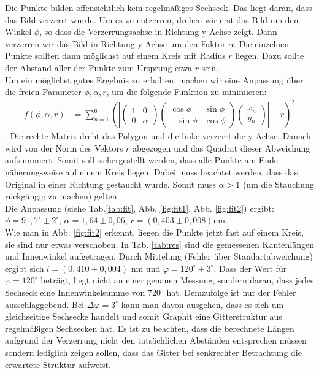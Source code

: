 Die Punkte bilden offensichtlich kein regelmäßiges Sechseck. Das liegt daran, dass das Bild verzerrt wurde. Um es zu entzerren, drehen wir erst das Bild um den Winkel $\phi$, so dass die Verzerrungsachse in Richtung y-Achse zeigt. Dann verzerren wir das Bild in Richtung y-Achse um den Faktor $\alpha$. Die einzelnen Punkte sollten dann möglichst auf einem Kreis mit Radius $r$ liegen. Dazu sollte der Abstand aller der Punkte zum Ursprung etwa $r$ sein.\\

Um ein möglichst gutes Ergebnis zu erhalten, machen wir eine Anpassung über die freien Parameter $\phi, \alpha, r$, um die folgende Funktion zu minimieren:
\begin{align*}
f(\phi,\alpha,r) &= \sum\limits_{n = 1}^6 \left(\left|
\begin{pmatrix}
1 & 0\\
0 & \alpha
\end{pmatrix}
\begin{pmatrix}
\cos{\phi} & \sin{\phi}\\
-\sin{\phi} & \cos{\phi}
\end{pmatrix}
\begin{pmatrix}
x_n\\
y_n
\end{pmatrix}
  \right| - r\right)^2
\end{align*}.
Die rechte Matrix dreht das Polygon und die linke verzerrt die y-Achse. Danach wird von der Norm des Vektors $r$ abgezogen und das Quadrat dieser Abweichung aufsummiert. Somit soll sichergestellt werden, dass alle Punkte am Ende näherungsweise auf einem Kreis liegen. Dabei muss beachtet werden, dass das Original in einer Richtung gestaucht wurde. Somit muss $\alpha > 1$ (um die Stauchung rückgängig zu machen) gelten.\\
Die Anpassung (siehe Tab.\ref{tab:fit}, Abb. \ref{fig:fit1}, Abb. \ref{fig:fit2}) ergibt: $\phi = 91,7^\circ \pm 2^\circ$, $\alpha = 1,64 \pm 0,06$, $r = (0,403 \pm 0,008)\si{\nano\metre}$.\\ 

Wie man in Abb. \ref{fig:fit2} erkennt, liegen die Punkte jetzt fast auf einem Kreis, sie sind nur etwas verschoben. In Tab. \ref{tab:res} sind die gemessenen Kantenlängen und Innenwinkel aufgetragen. Durch Mittelung (Fehler über Standartabweichung) ergibt sich $l = (0,410 \pm 0,004)$ nm und $\varphi = 120^\circ \pm 3^\circ$. Dass der Wert für $\varphi = 120^\circ$ beträgt, liegt nicht an einer genauen Messung, sondern daran, dass jedes Sechseck eine Innenwinkelsumme von $720^\circ$ hat. Demzufolge ist nur der Fehler ausschlaggebend. Bei $\Delta\varphi=3^\circ$ kann man davon ausgehen, dass es sich um gleichseitige Sechsecke handelt und somit Graphit eine Gitterstruktur aus regelmäßigen Sechsecken hat. Es ist zu beachten, dass die berechnete Längen aufgrund der Verzerrung nicht den tatsächlichen Abständen entsprechen müssen sondern lediglich zeigen sollen, dass das Gitter bei senkrechter Betrachtung die erwartete Struktur aufweist.

